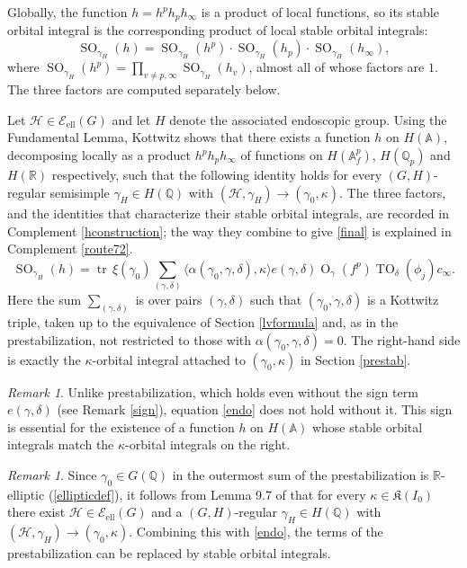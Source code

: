 \documentclass[11pt,a4paper]{article}
\newcommand{\Eell}{\mathcal{E}_{\mathrm{ell}}}
\theoremstyle{definition}
\theoremstyle{plain}
\theoremstyle{remark}
\newtheorem{R}[shared]{Remark}
\theoremstyle{plain}
\DeclareMathOperator{\tr}{tr}
\DeclareMathOperator{\Or}{O}
\DeclareMathOperator{\TO}{TO}
\DeclareMathOperator{\SO}{SO}
\begin{document}
Globally, the function $h = h^p h_p h_{\infty}$ is a product of local functions, so its stable orbital integral is the corresponding product of local stable orbital integrals:
$$\SO_{\gamma_H}(h) = \SO_{\gamma_H}(h^p) \cdot \SO_{\gamma_H}(h_p) \cdot \SO_{\gamma_H}(h_{\infty}),$$
where $\SO_{\gamma_H}(h^p) = \prod_{v \neq p, \infty} \SO_{\gamma_H}(h_v)$, almost all of whose factors are $1$. The three factors are computed separately below.

Let $\mathcal{H} \in \Eell(G)$ and let $H$ denote the associated endoscopic group. Using the Fundamental Lemma, Kottwitz \cite{MR1044820} shows that there exists a function $h$ on $H(\mathbb{A})$, decomposing locally as a product $h^p h_p h_{\infty}$ of functions on $H(\mathbb{A}_f^p)$, $H(\mathbb{Q}_p)$ and $H(\mathbb{R})$ respectively, such that the following identity holds for every $(G,H)$-regular semisimple $\gamma_H \in H(\mathbb{Q})$ with $(\mathcal{H}, \gamma_H) \xrightarrow[]{} (\gamma_0, \kappa)$. The three factors, and the identities that characterize their stable orbital integrals, are recorded in Complement \ref{hconstruction}; the way they combine to give \eqref{final} is explained in Complement \ref{route72}.
\begin{equation}\label{endo}
    \SO_{\gamma_H}(h) = \tr\,\xi(\gamma_0) \sum_{(\gamma, \delta)} \langle \alpha(\gamma_0, \gamma, \delta), \kappa \rangle e(\gamma, \delta)\Or_{\gamma}(f^p) \TO_{\delta}(\phi_j) c_{\infty}.
\end{equation}
Here the sum $\sum_{(\gamma, \delta)}$ is over pairs $(\gamma, \delta)$ such that $(\gamma_0, \gamma, \delta)$ is a Kottwitz triple, taken up to the equivalence of Section \ref{lvformula} and, as in the prestabilization, not restricted to those with $\alpha(\gamma_0,\gamma,\delta) = 0$. The right-hand side is exactly the $\kappa$-orbital integral attached to $(\gamma_0, \kappa)$ in Section \ref{prestab}.

\begin{R}\label{signessential}
    Unlike prestabilization, which holds even without the sign term $e(\gamma, \delta)$ (see Remark \ref{sign}), equation \eqref{endo} does not hold without it. This sign is essential for the existence of a function $h$ on $H(\mathbb{A})$ whose stable orbital integrals match the $\kappa$-orbital integrals on the right.
\end{R}

\begin{R}\label{kappaisreached}
    Since $\gamma_0 \in G(\mathbb{Q})$ in the outermost sum of the prestabilization is $\mathbb{R}$-elliptic (\ref{ellipticdef}), it follows from Lemma 9.7 of \cite{MR858284} that for every $\kappa \in \mathfrak{K}(I_0)$ there exist $\mathcal{H} \in \Eell(G)$ and a $(G,H)$-regular $\gamma_H \in H(\mathbb{Q})$ with $(\mathcal{H},\gamma_H) \xrightarrow[]{} (\gamma_0, \kappa)$. Combining this with \eqref{endo}, the terms of the prestabilization can be replaced by stable orbital integrals.
\end{R}
\end{document}
